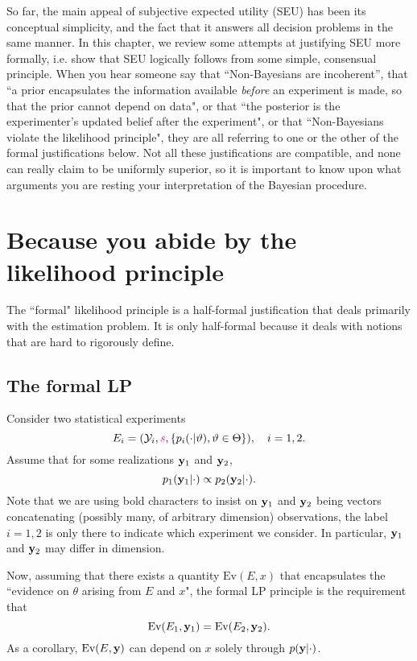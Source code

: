 So far, the main appeal of subjective expected utility (SEU) has been its conceptual simplicity, and the fact that it answers all decision problems in the same manner. 
In this chapter, we review some attempts at justifying SEU more formally, i.e. show that SEU logically follows from some simple, consensual principle.
When you hear someone say that ``Non-Bayesians are incoherent'', that ``a prior encapsulates the information available \emph{before} an experiment is made, so that the prior cannot depend on data", or that ``the posterior is the experimenter's updated belief after the experiment", or that ``Non-Bayesians violate the likelihood principle", they are all referring to one or the other of the formal justifications below. 
Not all these justifications are compatible, and none can really claim to be uniformly superior, so it is important to know upon what arguments you are resting your interpretation of the Bayesian procedure.

\section{Because you abide by the likelihood principle}
The ``formal" likelihood principle \citep{BeWo88} is a half-formal justification that deals primarily with the estimation problem. 
It is only half-formal because it deals with notions that are hard to rigorously define.

\subsection{The formal LP}
Consider two statistical experiments
$$
E_i=(\mathcal{Y}_i,\textcolor{magenta}{s}, \{p_i(\cdot\vert\vartheta), \vartheta\in\Theta\}), \quad i=1,2.
$$
Assume that for some realizations $\mathbf{y}_1$ and $\mathbf{y}_2$,
$$
p_1(\mathbf{y}_1\vert\cdot) \propto p_2(\mathbf{y}_2\vert \cdot).
$$
Note that we are using bold characters to insist on $\mathbf{y}_1$ and $\mathbf{y}_2$ being vectors concatenating (possibly many, of arbitrary dimension) observations, the label $i=1,2$ is only there to indicate which experiment we consider.
In particular, $\mathbf{y}_1$ and $\mathbf{y}_2$ may differ in dimension.

Now, assuming that there exists a quantity $\text{Ev}(E,x)$ that encapsulates the ``evidence on $\theta$ arising from $E$ and $x$", the formal LP principle is the requirement that
$$
\text{Ev}(E_1,\mathbf{y}_1) = \text{Ev}(E_2,\mathbf{y}_2).
$$
As a corollary, $\text{Ev}(E,\mathbf{y})$ can depend on $x$ solely through $p(\mathbf{y}\vert\cdot)$.

